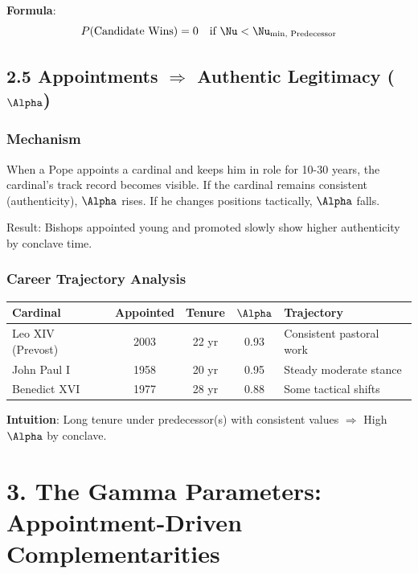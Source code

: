 \documentclass[11pt]{article}
\begin{document}
\textbf{Formula}:
\begin{equation}
P(\text{Candidate Wins}) = 0 \quad \text{if } \Nu < \Nu_{\text{min, Predecessor}}
\end{equation}

\subsection{2.5 Appointments $\Rightarrow$ Authentic Legitimacy ($\Alpha$)}

\subsubsection{Mechanism}

When a Pope appoints a cardinal and keeps him in role for 10-30 years, the cardinal's track record becomes visible. If the cardinal remains consistent (authenticity), $\Alpha$ rises. If he changes positions tactically, $\Alpha$ falls.

Result: Bishops appointed young and promoted slowly show higher authenticity by conclave time.

\subsubsection{Career Trajectory Analysis}

\begin{table}[h]
\centering
\begin{tabular}{|l|c|c|c|l|}
\hline
\textbf{Cardinal} & \textbf{Appointed} & \textbf{Tenure} & $\Alpha$ & \textbf{Trajectory} \\
\hline
Leo XIV (Prevost) & 2003 & 22 yr & 0.93 & Consistent pastoral work \\
John Paul I & 1958 & 20 yr & 0.95 & Steady moderate stance \\
Benedict XVI & 1977 & 28 yr & 0.88 & Some tactical shifts \\
\hline
\end{tabular}
\end{table}

\textbf{Intuition}: Long tenure under predecessor(s) with consistent values $\Rightarrow$ High $\Alpha$ by conclave.

\section{3. The Gamma Parameters: Appointment-Driven Complementarities}
\end{document}
